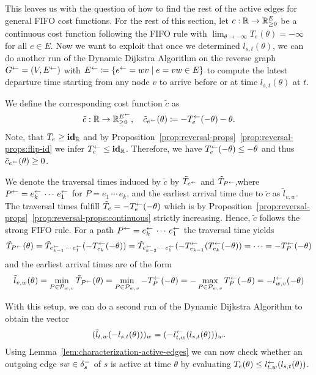 This leaves us with the question of how to find the rest of the active edges for general FIFO cost functions.
For the rest of this section, let $c:\mathbb{R}\rightarrow\mathbb{R}^E_{\geq0}$ be a continuous cost function following the FIFO rule with $\lim_{\theta\to-\infty} T_e(\theta) = -\infty$ for all $e\in E$.
Now we want to exploit that once we determined $l_{s,t}(\theta)$, we can do another run of the Dynamic Dijkstra Algorithm on the reverse graph $G^{\leftarrow} = (V, E^{\leftarrow})$ with $E^{\leftarrow}\coloneqq \{ e^{\leftarrow} = wv \mid e=vw\in E \}$ to compute the latest departure time starting from any node $v$ to arrive before or at time $l_{s,t}(\theta)$ at $t$.

We define the corresponding cost function $\tilde c$ as \[
    \tilde c : \mathbb{R} \rightarrow \mathbb{R}_{\geq0}^{E^{\leftarrow}}, \quad
    \tilde c_{e^{\leftarrow}}(\theta) \coloneqq - T_e^{\leftarrow}(-\theta) - \theta.
\]
Note, that $T_e  \geq \mathbf{id}_{\mathbb{R}}$ and by Proposition~\ref{prop:reversal-props}~\ref{prop:reversal-props:flip-id} we infer $T_e^{\leftarrow} \leq \mathbf{id}_{\mathbb{R}}$.
Therefore, we have $T_e^{\leftarrow}(-\theta) \leq -\theta$ and thus $\tilde c_{e^{\leftarrow}}(\theta) \geq 0$.

We denote the traversal times induced by $\tilde c$ by $\tilde T_{e^{\leftarrow}}$ and $\tilde T_{P^{\leftarrow}}$,where $P^{\leftarrow} = e_k^{\leftarrow} \, \cdots \, e_1^{\leftarrow}$ for $P = e_1\,\cdots\, e_k$,
and the earliest arrival time due to $\tilde c$ as $\tilde l_{v,w}$.
The traversal times fulfill $\tilde T_e = -T_e^{\leftarrow}(-\theta)$ which is by Proposition~\ref{prop:reversal-props}~\ref{prop:reversal-props:continuous} strictly increasing.
Hence, $\tilde c$ follows the strong FIFO rule.
For a path $P^{\leftarrow} = e_k^{\leftarrow}\,\cdots\, e_1^{\leftarrow}$ the traversal time yields
\[
    \tilde T_{P^{\leftarrow}} (\theta)
    = \tilde T_{e_{k-1}^{\leftarrow}\,\cdots\,e_1^{\leftarrow}}(- T_{e_k}^{\leftarrow} ( - \theta ))
    = \tilde T_{e_{k-2}^{\leftarrow}\,\cdots\,e_1^{\leftarrow}}(-T_{e_{k-1}}^{\leftarrow} (T_{e_k}^{\leftarrow} ( - \theta ))
    = \cdots
    = - T_P^{\leftarrow}(-\theta)
\]
and the earliest arrival times are of the form
\[
    \tilde l_{v,w}(\theta)
    = \min_{P\in\mathcal{P}_{w,v}} \tilde T_{P^{\leftarrow}}(\theta)
    = \min_{P\in\mathcal{P}_{w,v}} - T_P^{\leftarrow}(-\theta)
    = - \max_{P\in\mathcal{P}_{w,v}} T_P^{\leftarrow}(-\theta)
    = - l_{w,v}^{\leftarrow}(-\theta)
\]

With this setup, we can do a second run of the Dynamic Dijkstra Algorithm to obtain the vector \[
    (\tilde l_{t,w}( - l_{s,t}(\theta) ))_w = (- l_{t,w}^{\leftarrow}( l_{s,t}(\theta) ))_w.
\]
Using Lemma~\ref{lem:characterization-active-edges} we can now check whether an outgoing edge $sw\in\delta^-_{s}$ of $s$ is active at time $\theta$ by evaluating $T_e(\theta) \leq l_{t,w}^{\leftarrow}( l_{s,t}(\theta))$.

